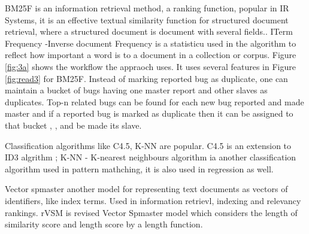 \documentclass[]{sig-alternate-05-2015}
\begin{document}
BM25F is an information retrieval method, a ranking function, popular in IR Systems, it is an effective textual similarity function for structured document retrieval, where a structured document is document with several fields.\cite{Sun2011}. ITerm Frequency -Inverse document Frequency is a statisticu used in the algorithm to reflect how important a word is to a document in a collection or corpus. Figure \ref{fig:3a} shows the workflow the appraoch uses. It uses several features in Figure \ref{fig:read3} for BM25F.  Instead of marking reported bug as duplicate, one can maintain a bucket of bugs having one master report and other slaves as duplicates. Top-n related bugs can be found for each new bug reported and made master and if a reported
bug is marked as duplicate then it can be assigned to that
bucket \cite{Sureka2010}, \cite{} , \cite{Runeson2007} and be made its slave.\newline

Classification algorithms like C4.5, K-NN are popular. C4.5 is an extension to ID3 algrithm \cite{Hssina2014}; K-NN - K-nearest neighbours \cite{Cai2010} algorithm ia another classification algorithm used in pattern mathching, it is also used in regression as well.\newline

Vector spmaster another \cite{Turner2010} model for representing text documents as vectors of identifiers, like index terms. Used in information retrievl, indexing and relevancy rankings. rVSM is revised Vector Spmaster model which considers the length of similarity score and length score by a length function.
\end{document}
